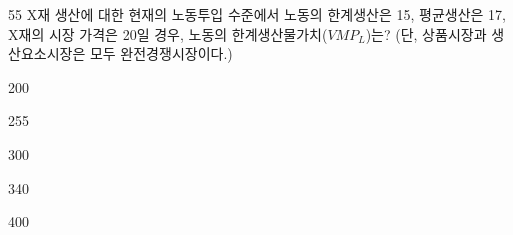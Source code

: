 \begin{question}{55}
X재 생산에 대한 현재의 노동투입 수준에서 노동의 한계생산은 15, 평균생산은 17, X재의 시장 가격은 20일 경우, 노동의 한계생산물가치($VMP_L$)는? (단, 상품시장과 생산요소시장은 모두 완전경쟁시장이다.)
\begin{choices}
  \item 200
  \item 255
  \item 300
  \item 340
  \item 400
\end{choices}
\end{question}
